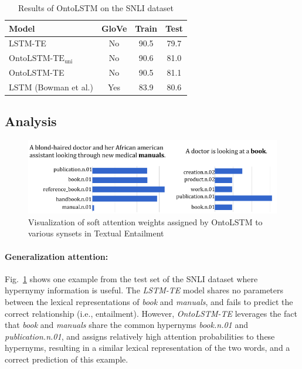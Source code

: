 \begin{table}
    \centering
    \begin{tabular}{|l|c|c|c|}
    \hline
    \textbf{Model} & \textbf{GloVe} & \textbf{Train} & \textbf{Test}\\
    \hline
    LSTM-TE                        & No & 90.5 & 79.7 \\
    $\text{OntoLSTM-TE}_\text{uni}$  & No & 90.6 & 81.0 \\
    OntoLSTM-TE  & No & 90.5 & 81.1 \\ \hline
    LSTM (Bowman et al.) & Yes & 83.9 & 80.6 \\
    \hline
    \end{tabular}
    \caption{Results of OntoLSTM on the SNLI dataset}
    \label{tab:ontolstm_snli_results}
\end{table}


\subsection{Analysis}
\label{sec:ontolstm_snli_discussion}
\begin{figure}
\begin{center}
\includegraphics[width=5in]{figures/ontolstm_snli_comparison.png}
\caption{Visualization of soft attention weights assigned by OntoLSTM to various synsets in Textual Entailment}
\label{fig:ontolstm_snli_visualization}
\end{center}
\end{figure}

\paragraph{Generalization attention:} \label{sec:ontolstm_snli_generalization}
Fig.~\ref{fig:ontolstm_snli_visualization} shows one example from the test set of the 
SNLI dataset where hypernymy information is useful. 
The \textit{LSTM-TE} model shares no parameters between the lexical representations of 
\textit{book} and \textit{manuals}, and fails to predict the correct 
relationship (i.e., entailment). 
However, \textit{OntoLSTM-TE} leverages the fact that \textit{book} 
and \textit{manuals} share the common hypernyms \textit{book.n.01} and 
\textit{publication.n.01}, and assigns relatively high attention probabilities 
to these hypernyms, resulting in a similar lexical representation of the two 
words, and a correct prediction of this example.

